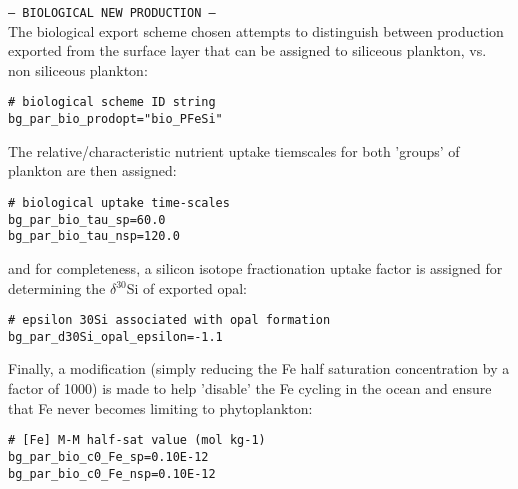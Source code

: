 \documentclass[10pt,twoside]{article}
\begin{document}
\begin{compactitem}

\item \texttt{--- BIOLOGICAL NEW PRODUCTION ---}
\\The biological export scheme chosen attempts to distinguish between  production exported from the surface layer that can be assigned to siliceous plankton, vs. non siliceous plankton:
\vspace{-5pt}\begin{verbatim}
# biological scheme ID string
bg_par_bio_prodopt="bio_PFeSi"
\end{verbatim}\vspace{-5pt}
The relative/characteristic nutrient uptake tiemscales for both 'groups' of plankton are then assigned:
\vspace{-5pt}\begin{verbatim}
# biological uptake time-scales
bg_par_bio_tau_sp=60.0
bg_par_bio_tau_nsp=120.0
\end{verbatim}\vspace{-5pt}
and for completeness, a silicon isotope fractionation uptake factor is assigned for determining the \(\delta\)\(^{30}\)Si of exported opal:
\vspace{-5pt}\begin{verbatim}
# epsilon 30Si associated with opal formation
bg_par_d30Si_opal_epsilon=-1.1
\end{verbatim}\vspace{-5pt}
Finally, a modification (simply reducing the Fe half saturation concentration by a factor of 1000) is made to help 'disable' the Fe cycling in the ocean and ensure that Fe never becomes limiting to phytoplankton:
\vspace{-5pt}\begin{verbatim}
# [Fe] M-M half-sat value (mol kg-1)
bg_par_bio_c0_Fe_sp=0.10E-12
bg_par_bio_c0_Fe_nsp=0.10E-12
\end{verbatim}\vspace{-5pt}


\end{compactitem}
\end{document}
